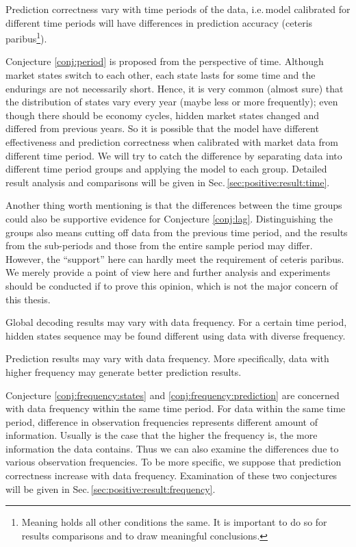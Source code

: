         \begin{conj}
        \label{conj:period}
        Prediction correctness vary with time periods of the data,
        i.e.\,model calibrated for different time periods will have differences in prediction accuracy 
        (ceteris paribus\footnote{Meaning holds all other conditions the same. 
        It is important to do so for results comparisons and to draw meaningful conclusions.}).
        \end{conj}
Conjecture \ref{conj:period} is proposed from the perspective of time.
Although market states switch to each other, 
each state lasts for some time and the endurings are not necessarily short.
Hence, it is very common (almost sure) that the distribution of states 
vary every year (maybe less or more frequently);
even though there should be economy cycles,
hidden market states changed and differed from previous years.
So it is possible that the model have different effectiveness and prediction correctness 
when calibrated with market data from different time period.
We will try to catch the difference by separating data into different time period groups
and applying the model to each group.
Detailed result analysis and comparisons will be given in Sec.\,\ref{sec:positive:result:time}.

Another thing worth mentioning is that the differences between the time groups
could also be supportive evidence for Conjecture \ref{conj:lag}.
Distinguishing the groups also means cutting off data from the previous time period,
and the results from the sub-periods and those from the entire sample period may differ.
However, the ``support'' here can hardly meet the requirement of ceteris paribus.
We merely provide a point of view here and further analysis and experiments 
should be conducted if to prove this opinion,
which is not the major concern of this thesis.


        \begin{conj}
        \label{conj:frequency:states}
        Global decoding results may vary with data frequency.
        For a certain time period, 
        hidden states sequence may be found different using data with diverse frequency.
        \end{conj}

        \begin{conj}
        \label{conj:frequency:prediction}
        Prediction results may vary with data frequency.
        More specifically, data with higher frequency may generate better prediction results.
        \end{conj}
Conjecture \ref{conj:frequency:states} and \ref{conj:frequency:prediction} 
are concerned with data frequency within the same time period.
For data within the same time period,
difference in observation frequencies represents different amount of information.
Usually is the case that the higher the frequency is, the more information the data contains.
Thus we can also examine the differences due to various observation frequencies.
To be more specific, we suppose that prediction correctness increase with data frequency.
Examination of these two conjectures will be given in Sec.\,\ref{sec:positive:result:frequency}.

